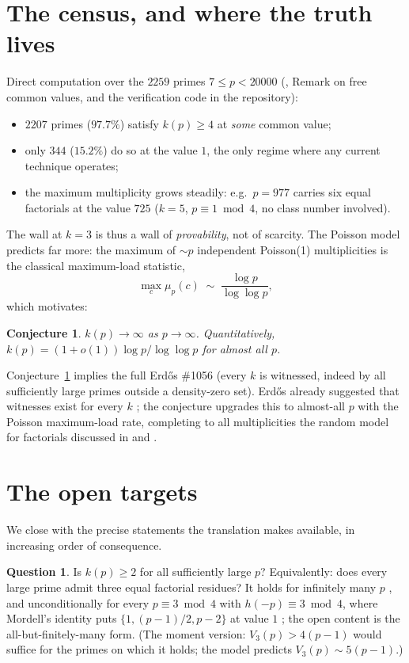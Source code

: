 \documentclass[11pt]{article}
\newtheorem{conjecture}[theorem]{Conjecture}
\theoremstyle{definition}
\newtheorem{question}[theorem]{Question}
\theoremstyle{remark}
\begin{document}
\section{The census, and where the truth lives}

Direct computation over the $2259$ primes $7 \le p < 20000$
(\cite{Hino}, Remark on free common values, and the verification code in
the repository):

\begin{itemize}
  \item $2207$ primes ($97.7\%$) satisfy $k(p) \ge 4$ at \emph{some}
    common value;
  \item only $344$ ($15.2\%$) do so at the value $1$, the only regime
    where any current technique operates;
  \item the maximum multiplicity grows steadily: e.g.\ $p = 977$ carries
    six equal factorials at the value $725$ ($k = 5$, $p \equiv 1 \bmod
    4$, no class number involved).
\end{itemize}

The wall at $k = 3$ is thus a wall of \emph{provability}, not of scarcity.
The Poisson model predicts far more: the maximum of $\sim p$ independent
Poisson(1) multiplicities is the classical maximum-load statistic,
\[
  \max_c \mu_p(c) \;\sim\; \frac{\log p}{\log \log p},
\]
which motivates:

\begin{conjecture}\label{conj:aa}
$k(p) \to \infty$ as $p \to \infty$. Quantitatively,
$k(p) = (1+o(1)) \log p / \log\log p$ for almost all $p$.
\end{conjecture}

Conjecture~\ref{conj:aa} implies the full Erd\H{o}s \#1056 (every $k$ is
witnessed, indeed by all sufficiently large primes outside a density-zero
set). Erd\H{o}s already suggested that witnesses exist for every $k$
\cite{Gu04}; the conjecture upgrades this to almost-all $p$ with the
Poisson maximum-load rate, completing to all multiplicities the random
model for factorials discussed in \cite{KM} and \cite{CZ}.

\section{The open targets}

We close with the precise statements the translation makes available, in
increasing order of consequence.

\begin{question}\label{q:base}
Is $k(p) \ge 2$ for all sufficiently large $p$? Equivalently: does every
large prime admit three equal factorial residues? It holds for infinitely
many $p$ \cite{AAHS}, and unconditionally for every $p \equiv 3 \bmod 4$
with $h(-p) \equiv 3 \bmod 4$, where Mordell's identity puts
$\{1, (p-1)/2, p-2\}$ at value $1$ \cite{Hino}; the open content is the
all-but-finitely-many form. (The moment version: $V_3(p) > 4(p-1)$ would
suffice for the primes on which it holds; the model predicts
$V_3(p) \sim 5(p-1)$.)
\end{question}
\end{document}
